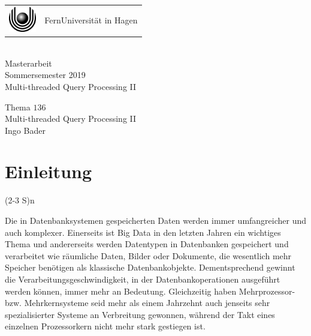 \documentclass[a4paper,12pt,twoside]{article}
\newcommand{\No}{$136$}
\newcommand{\Theme}{Multi-threaded Query Processing II}
\newcommand{\Name}{Ingo Bader}
\begin{document}
\thispagestyle{empty}
\pagestyle{empty}

\begin{center}
\begin{huge}
\vspace*{3cm}
    \begin{tabular}{m{1.2cm}@{\ \ }m{9cm}}
      \includegraphics[width=1.2cm]{logo.eps} & {FernUniversität in Hagen}
    \end{tabular}
    \\
    \vspace*{3cm}
   Masterarbeit \\
   Sommersemester 2019 \\[2em]
   \glqq{}Multi-threaded Query Processing II\grqq{} \\[2cm]
\end{huge}
\begin{large}
   Thema \No\\[1em]
   \Theme\\[3cm]
   \Name
\end{large}
\end{center}

\clearpage
\tableofcontents
\clearpage
\raggedbottom
\thispagestyle{fancy}
\pagestyle{fancy}
\setcounter{page}{1}

\section{Einleitung} (2-3 S)n

Die in Datenbanksystemen gespeicherten Daten werden immer umfangreicher und auch komplexer. Einerseits ist Big Data in den letzten Jahren ein wichtiges Thema und andererseits werden Datentypen in Datenbanken gespeichert und verarbeitet wie räumliche Daten, Bilder oder Dokumente, die wesentlich mehr Speicher benötigen als klassische Datenbankobjekte. Dementsprechend gewinnt die Verarbeitungsgeschwindigkeit, in der Datenbankoperationen ausgeführt werden können, immer mehr an Bedeutung. Gleichzeitig haben Mehrprozessor- bzw. Mehrkernsysteme seid mehr als einem Jahrzehnt auch jenseits sehr spezialisierter Systeme an Verbreitung gewonnen, während der Takt eines einzelnen Prozessorkern nicht mehr stark gestiegen ist.
\end{document}
